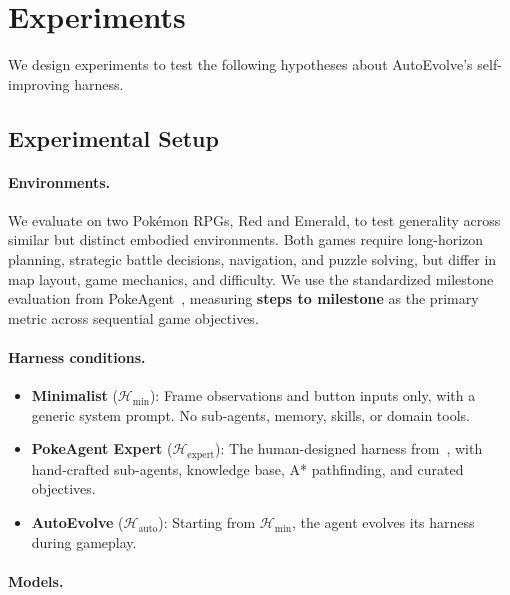 \section{Experiments}\label{sec:experiments}

We design experiments to test the following hypotheses about AutoEvolve's self-improving harness.

\subsection{Experimental Setup}

\paragraph{Environments.} We evaluate on two Pok\'{e}mon RPGs, Red and Emerald, to test generality across similar but distinct embodied environments. Both games require long-horizon planning, strategic battle decisions, navigation, and puzzle solving, but differ in map layout, game mechanics, and difficulty. We use the standardized milestone evaluation from PokeAgent~\citep{karten2025pokeagent}, measuring \textbf{steps to milestone} as the primary metric across sequential game objectives.

\paragraph{Harness conditions.}
\begin{itemize}
    \item \textbf{Minimalist} ($\mathcal{H}_{\min}$): Frame observations and button inputs only, with a generic system prompt. No sub-agents, memory, skills, or domain tools.
    \item \textbf{PokeAgent Expert} ($\mathcal{H}_{\text{expert}}$): The human-designed harness from~\citet{karten2025pokeagent}, with hand-crafted sub-agents, knowledge base, A* pathfinding, and curated objectives.
    \item \textbf{AutoEvolve} ($\mathcal{H}_{\text{auto}}$): Starting from $\mathcal{H}_{\min}$, the agent evolves its harness during gameplay.
\end{itemize}

\paragraph{Models.} 

